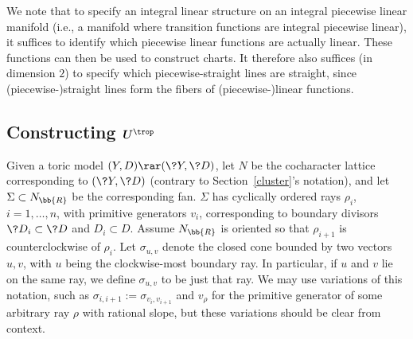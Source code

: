We note that to specify an integral linear structure on an integral piecewise linear manifold (i.e., a manifold where transition functions are integral piecewise linear), it suffices to identify which piecewise linear functions are actually linear. These functions can then be used to construct charts. It therefore also suffices (in dimension $2$) to specify which piecewise-straight lines are straight, since (piecewise-)straight lines form the fibers of (piecewise-)linear functions.

\subsection[Constructing $U^{\trop}$]{Constructing $\boldsymbol{U^{\trop}}$} \label{Ut}

\begin{ntn}\label{UtropNotation} Given a toric model $(Y,D) \rar (\?{Y},\?{D})$, let $N$ be the cocharacter lattice corresponding to $(\?{Y},\?{D})$ (contrary to Section~\ref{cluster}'s notation), and let $\Sigma\subset N_{\bb{R}}$ be the corresponding fan. $\Sigma$ has cyclically ordered rays $\rho_i$, $i=1,\dots,n$, with primitive generators $v_i$, corresponding to boundary divisors $\?{D_i}\subset \?{D}$ and $D_i \subset D$. Assume $N_{\bb{R}}$ is oriented so that $\rho_{i+1}$ is counterclockwise of $\rho_i$. Let $\sigma_{u,v}$ denote the closed cone bounded by two vectors $u,v$, with $u$ being the clockwise-most boundary ray. In particular, if $u$ and $v$ lie on the same ray, we define $\sigma_{u,v}$ to be just that ray. We may use variations of this notation, such as $\sigma_{i,i+1}:=\sigma_{v_i,v_{i+1}}$ and $v_{\rho}$ for the primitive generator of some arbitrary ray $\rho$ with rational slope, but these variations should be clear from context.
\end{ntn}

